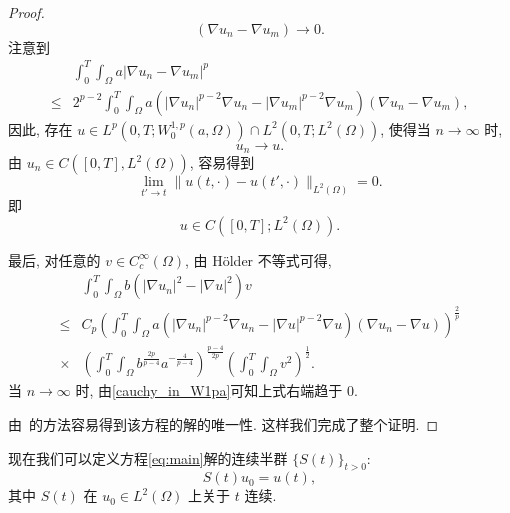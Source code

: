\documentclass[oneside,longtitle]{LZUthesis}
\numberwithin{equation}{chapter}
\newcommand*\abs[1]{\lvert#1\rvert}
\newcommand*\norm[1]{\lVert#1\rVert}
\newcommand*\Brace[1]{\lbrace#1\rbrace}
\begin{document}
\begin{proof}
\begin{equation}
		\left(\nabla u_n - \nabla u_m\right)
		\to 0.
	\end{equation}
	注意到
	\begin{equation*}
		\begin{split}
			& \int_0^T\int_{\Omega}a\abs{\nabla u_n - \nabla u_m}^p\\
			\leq{} & 2^{p-2}\int_{0}^{T}\int_{\Omega}a
			\left(\abs{\nabla u_n}^{p-2}\nabla u_n
			- \abs{\nabla u_m}^{p-2}\nabla u_m\right)
			\left(\nabla u_n - \nabla u_m\right),
		\end{split}
	\end{equation*}
	因此, 存在 $u \in L^p(0, T; W_0^{1,p}(a,\Omega))
		\cap L^2(0, T; L^2(\Omega))$, 使得当 $n \to \infty$ 时,
	\begin{equation*}
		u_{n} \to u.
	\end{equation*}
	由 $u_n \in C([0, T], L^2(\Omega))$, 容易得到
	\begin{equation*}
		\lim_{t' \to t}\norm{u(t,\cdot)-u(t',\cdot)}_{L^2(\Omega)}=0.
	\end{equation*}
	即
	\begin{equation*}
		u \in C([0, T]; L^2(\Omega)).
	\end{equation*}

	最后,
	对任意的 $v \in C_c^\infty(\Omega)$, 由 H\"older 不等式可得,
	\begin{equation*}
		\begin{split}
			& \int_0^T\int_{\Omega}b\left(\abs{\nabla u_n}^2
			- \abs{\nabla u}^2\right)v\\
			\leq{} & C_p\left(\int_0^T\int_{\Omega}a
			\left(\abs{\nabla u_n}^{p-2}\nabla u_n
			- \abs{\nabla u}^{p-2}\nabla u\right)
			\left(\nabla u_n - \nabla u\right)\right)^{\frac{2}{p}}\\
			\times{} & \left(\int_0^T\int_{\Omega}b^{\frac{2p}{p-4}}a^{-\frac{4}{p-4}}\right)^{\frac{p-4}{2p}}
			\left(\int_0^T\int_{\Omega}v^2\right)^{\frac{1}{2}}.
		\end{split}
	\end{equation*}
	当 $n \to \infty$ 时, 由\eqref{cauchy_in_W1pa}可知上式右端趋于 $0$.
	
	由~\cite{Zhan2019Uniquenessa}的方法容易得到该方程的解的唯一性.
	这样我们完成了整个证明.
\end{proof}

现在我们可以定义方程\eqref{eq:main}解的连续半群 $\Brace{S(t)}_{t>0}$:
\begin{equation*}
	S(t)u_0 = u(t),
\end{equation*}
其中 $S(t)$ 在 $u_{0} \in L^2(\Omega)$ 上关于 $t$ 连续.
\end{document}
